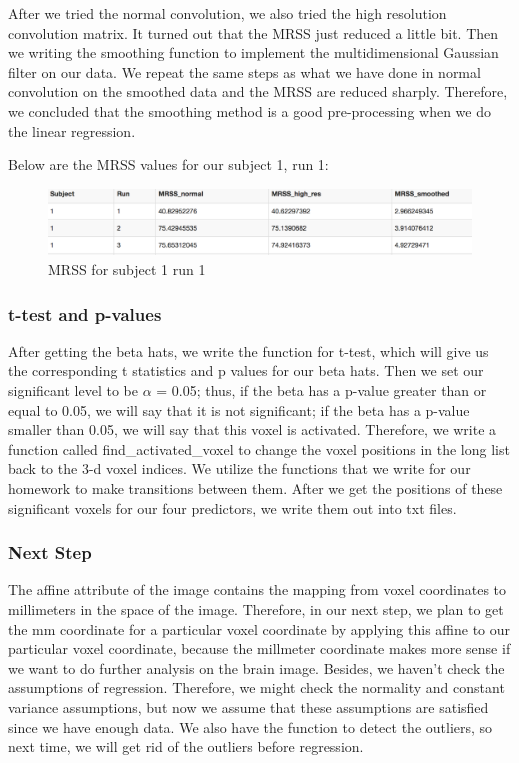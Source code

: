 \noindent
After we tried the normal convolution, we also tried the high resolution convolution matrix. It turned out that the MRSS just reduced a little bit. Then we writing the smoothing function to implement the multidimensional Gaussian filter on our data. We repeat the same steps as what we have done in normal convolution on the smoothed data and the MRSS are reduced sharply. Therefore, we concluded that the smoothing method is a good pre-processing when we do the linear regression. \newline

\noindent
Below are the MRSS values for our subject 1, run 1: \newline
\begin{figure}[H]
    \centering
        \includegraphics[scale=0.5]{../plots/mrss_result001.png}
    \caption{MRSS for subject 1 run 1}
\end{figure}


\subsubsection{t-test and p-values}
\noindent
After getting the beta hats, we write the function for t-test, which will give us the corresponding t statistics and p values for our beta hats. Then we set our significant level to be $\alpha$ = 0.05; thus, if the beta has a p-value greater than or equal to 0.05, we will say that it is not significant; if the beta has a p-value smaller than 0.05, we will say that this voxel is activated. \newline
\noindent Therefore, we write a function called find\_activated\_voxel to change the voxel positions in the long list back to the 3-d voxel indices. We utilize the functions that we write for our homework to make transitions between them. After we get the positions of these significant voxels for our four predictors, we write them out into txt files. \newline


\subsubsection{Next Step}
\noindent
The affine attribute of the image contains the mapping from voxel coordinates to millimeters in the space of the image. Therefore, in our next step, we plan to get the mm coordinate for a particular voxel coordinate by applying this affine to our particular voxel coordinate, because the millmeter coordinate makes more sense if we want to do further analysis on the brain image. \newline
Besides, we haven't check the assumptions of regression. Therefore, we might check the normality and constant variance assumptions, but now we assume that these assumptions are satisfied since we have enough data. We also have the function to detect the outliers, so next time, we will get rid of the outliers before regression. \newline


